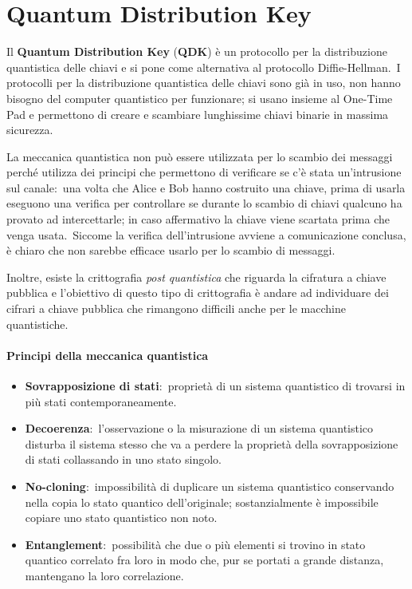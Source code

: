 \chapter{Quantum Distribution Key}

Il \textbf{Quantum Distribution Key} (\textbf{QDK}) è un protocollo per la distribuzione quantistica delle chiavi e si pone come alternativa al protocollo Diffie-Hellman.\
I protocolli per la distribuzione quantistica delle chiavi sono già in uso, non hanno bisogno del computer quantistico per funzionare; si usano insieme al One-Time Pad e permettono di creare e scambiare lunghissime chiavi binarie in massima sicurezza.\

La meccanica quantistica non può essere utilizzata per lo scambio dei messaggi perché utilizza dei principi che permettono di verificare se c'è stata un'intrusione sul canale:\ una volta che Alice e Bob hanno costruito una chiave, prima di usarla eseguono una verifica per controllare se durante lo scambio di chiavi qualcuno ha provato ad intercettarle; in caso affermativo la chiave viene scartata prima che venga usata.\
Siccome la verifica dell'intrusione avviene a comunicazione conclusa, è chiaro che non sarebbe efficace usarlo per lo scambio di messaggi.\

Inoltre, esiste la crittografia \textit{post quantistica} che riguarda la cifratura a chiave pubblica e l'obiettivo di questo tipo di crittografia è andare ad individuare dei cifrari a chiave pubblica che rimangono difficili anche per le macchine quantistiche.\

\subsubsection{Principi della meccanica quantistica}

\begin{itemize}
    \item \textbf{Sovrapposizione di stati}:\ proprietà di un sistema quantistico di trovarsi in più stati contemporaneamente.
    \item \textbf{Decoerenza}:\ l'osservazione o la misurazione di un sistema quantistico disturba il sistema stesso che va a perdere la proprietà della sovrapposizione di stati collassando in uno stato singolo.
    \item \textbf{No-cloning}:\ impossibilità di duplicare un sistema quantistico conservando nella copia lo stato quantico dell'originale; sostanzialmente è impossibile copiare uno stato quantistico non noto.
    \item \textbf{Entanglement}:\ possibilità che due o più elementi si trovino in stato quantico correlato fra loro in modo che, pur se portati a grande distanza, mantengano la loro correlazione.
\end{itemize}

